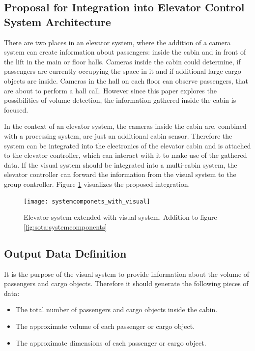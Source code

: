 \subsection{Proposal for Integration into Elevator Control System Architecture}

There are two places in an elevator system, where the addition of a camera system can create information about passengers: inside the cabin and in front of the lift in the main or floor halls.
Cameras inside the cabin could determine, if passengers are currently occupying the space in it and if additional large cargo objects are inside.
Cameras in the hall on each floor can observe passengers, that are about to perform a hall call.
However since this paper explores the possibilities of volume detection, 
the information gathered inside the cabin is focused.

In the context of an elevator system, 
the cameras inside the cabin are, 
combined with a processing system, 
are just an additional cabin sensor.
Therefore the system can be integrated into the electronics of the elevator cabin
and is attached to the elevator controller, 
which can interact with it to make use of the gathered data.
If the visual system should be integrated into a multi-cabin system, 
the elevator controller can forward the information from the visual system to the group controller.
Figure \ref{fig:design:systemintegration} visualizes the proposed integration.

\begin{figure}[htb]
    \centering
    \texttt{[image: systemcomponets\_with\_visual]}
    \caption[Elevator system extended with visual system]{Elevator system extended with visual system. Addition to figure \ref{fig:sota:systemcomponents}}
    \label{fig:design:systemintegration}
\end{figure}

\subsection{Output Data Definition}

It is the purpose of the visual system to provide information about the volume of passengers and cargo objects.
Therefore it should generate the following pieces of data: 

\begin{itemize}
    \item The total number of passengers and cargo objects inside the cabin.
    \item The approximate volume of each passenger or cargo object.
    \item The approximate dimensions of each passenger or cargo object.
\end{itemize}

